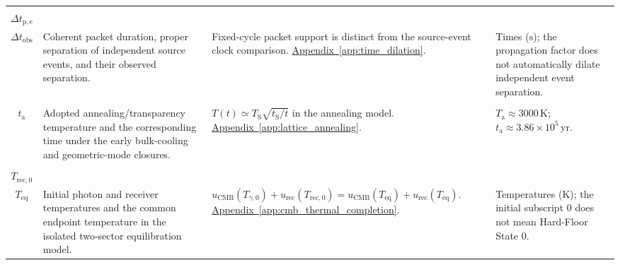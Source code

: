 \begin{longtable}{@{} c p{5.5cm} p{4cm} p{3.5cm} @{}}
\begin{tabular}[c]{@{}c@{}}$\Delta t_{\mathrm{pkt}}$ \\ $\Delta t_{\mathrm{p,e}}$ \\ $\Delta t_{\mathrm{obs}}$\end{tabular} & {\raggedright Coherent packet duration, proper separation of independent source events, and their observed separation.\par} & {\raggedright Fixed-cycle packet support is distinct from the source-event clock comparison. \newline \hyperref[app:time_dilation]{Appendix~\ref*{app:time_dilation}}.\par} & {\raggedright Times ($\mathrm s$); the propagation factor does not automatically dilate independent event separation.\par} \\

\begin{tabular}[c]{@{}c@{}}$T_{\mathrm a}$ \\ $t_{\mathrm a}$\end{tabular} & {\raggedright Adopted annealing/transparency temperature and the corresponding time under the early bulk-cooling and geometric-mode closures.\par} & {\raggedright $T(t)\simeq T_{\mathrm S}\sqrt{t_{\mathrm S}/t}$ in the annealing model. \newline \hyperref[app:lattice_annealing]{Appendix~\ref*{app:lattice_annealing}}.\par} & {\raggedright $T_{\mathrm a}\approx3000\,\mathrm K$; $t_{\mathrm a}\approx3.86\times10^5\,\mathrm{yr}$.\par} \\

\begin{tabular}[c]{@{}c@{}}$T_{\gamma,0}$ \\ $T_{\mathrm{rec},0}$ \\ $T_{\mathrm{eq}}$\end{tabular} & {\raggedright Initial photon and receiver temperatures and the common endpoint temperature in the isolated two-sector equilibration model.\par} & {\raggedright $u_{\mathrm{CMB}}(T_{\gamma,0})+u_{\mathrm{rec}}(T_{\mathrm{rec},0})=u_{\mathrm{CMB}}(T_{\mathrm{eq}})+u_{\mathrm{rec}}(T_{\mathrm{eq}})$. \newline \hyperref[app:cmb_thermal_completion]{Appendix~\ref*{app:cmb_thermal_completion}}.\par} & {\raggedright Temperatures ($\mathrm K$); the initial subscript $0$ does not mean Hard-Floor State 0.\par} \\


\end{longtable}
